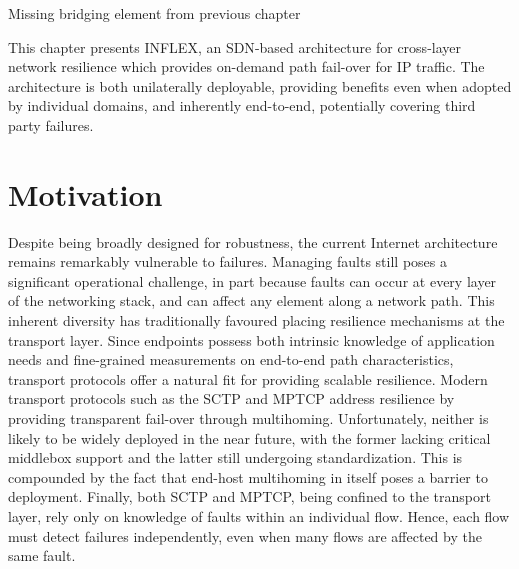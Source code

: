 {\COMMENT Missing bridging element from previous chapter}

This chapter presents INFLEX, an \ac{SDN}-based architecture for cross-layer network resilience which provides on-demand path fail-over for \ac{IP} traffic. 
The architecture is both unilaterally deployable, providing benefits even when adopted by individual domains, and inherently end-to-end, potentially covering third party failures.


\section{Motivation}

Despite being broadly designed for robustness, the current Internet architecture remains remarkably vulnerable to failures.
Managing faults still poses a significant operational challenge, in part because faults can occur at every layer of the networking stack, and can affect any element along a network path. 
This inherent diversity has traditionally favoured placing resilience mechanisms at the transport layer. 
Since endpoints possess both intrinsic knowledge of application needs and fine-grained measurements on end-to-end path characteristics, transport protocols offer a natural fit for providing scalable resilience.
Modern transport protocols such as the \ac{SCTP} \cite{rfc4960} and \ac{MPTCP} \cite{Wischik:2008p137} address resilience by providing transparent fail-over through multihoming.
Unfortunately, neither is likely to be widely deployed in the near future, with the former lacking critical middlebox support and the latter still undergoing standardization. 
This is compounded by the fact that end-host multihoming in itself poses a barrier to deployment.
Finally, both \ac{SCTP} and \ac{MPTCP}, being confined to the transport layer, rely only on knowledge of faults within an individual flow. Hence, each flow must detect failures independently, even when many flows are affected by the same fault.

